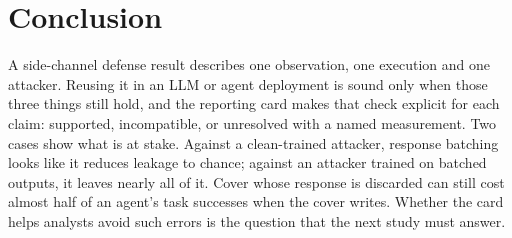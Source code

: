 \section{Conclusion}\label{sec:conclusion}
A side-channel defense result describes one observation, one execution and one attacker. Reusing it in an LLM or agent deployment is sound only when those three things still hold, and the reporting card makes that check explicit for each claim: supported, incompatible, or unresolved with a named measurement. Two cases show what is at stake. Against a clean-trained attacker, response batching looks like it reduces leakage to chance; against an attacker trained on batched outputs, it leaves nearly all of it. Cover whose response is discarded can still cost almost half of an agent's task successes when the cover writes. Whether the card helps analysts avoid such errors is the question that the next study must answer.
